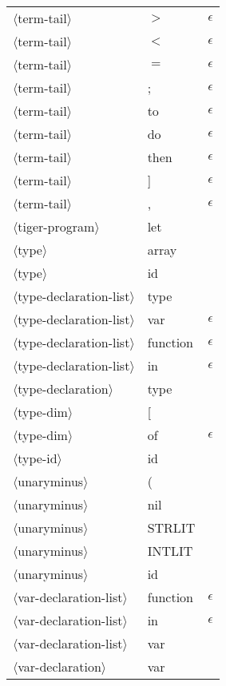 \documentclass[11pt, fleqn]{article}
\newcommand{\atag}[1]{$\langle$#1$\rangle$}
\begin{document}
\begin{longtable}{l|l|l}
\atag{term-tail}					&	$>$		&	$\epsilon$		\\
\atag{term-tail}					&	$<$		&	$\epsilon$		\\
\atag{term-tail}					&	$=$		&	$\epsilon$		\\
\atag{term-tail}					&	;		&	$\epsilon$		\\
\atag{term-tail}					&	to		&	$\epsilon$		\\
\atag{term-tail}					&	do		&	$\epsilon$		\\
\atag{term-tail}					&	then		&	$\epsilon$		\\
\atag{term-tail}					&	]		&	$\epsilon$		\\
\atag{term-tail}					&	,		&	$\epsilon$		\\
\atag{tiger-program}				&	let		&		\\
\atag{type}						&	array		&		\\
\atag{type}						&	id		&	\\
\atag{type-declaration-list}		&	type		&		\\
\atag{type-declaration-list}		&	var		&	$\epsilon$	\\
\atag{type-declaration-list}		&	function		&	$\epsilon$\\
\atag{type-declaration-list}		&	in		&	$\epsilon$\\
\atag{type-declaration}			&	type 	&		\\
\atag{type-dim}					&	[		&	\\
\atag{type-dim}					&	of	&	$\epsilon$	\\
\atag{type-id}					&	id		&		\\
\atag{unaryminus}				&	(		&		\\
\atag{unaryminus}				&	nil		&		\\
\atag{unaryminus}				&	STRLIT		&		\\
\atag{unaryminus}				&	INTLIT		&		\\
\atag{unaryminus}				&	id		&		\\
\atag{var-declaration-list}		&	function		&	$\epsilon$	\\
\atag{var-declaration-list}		&	in	&		$\epsilon$		\\
\atag{var-declaration-list}		&	var		& 			\\
\atag{var-declaration}			&	var 		&		\\
\end{longtable}
\end{document}
